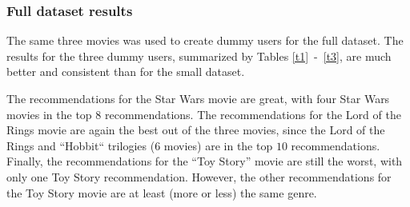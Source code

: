 \documentclass{article}
\begin{document}
    
\begin{table}[h!]
    \centering
    \caption{Predictions for Toy Story (1995).}
    \label{tt3}
\end{table}

\newpage

\subsubsection{Full dataset results}
The same three movies was used to create dummy users for the full dataset.
The results for the three dummy users, summarized by Tables \ref{t1}~-~\ref{t3}, are much better and consistent than for the small dataset.

The recommendations for the Star Wars movie are great, with four Star Wars movies in the top $8$ recommendations. 
The recommendations for the Lord of the Rings movie are again the best out of the three movies,
since the Lord of the Rings and ``Hobbit`` trilogies ($6$ movies) are in the top $10$ recommendations.
Finally, the recommendations for the ``Toy Story'' movie are still the worst, with only one Toy Story recommendation.
However, the other recommendations for the Toy Story movie are at least (more or less) the same genre. 
\end{document}
